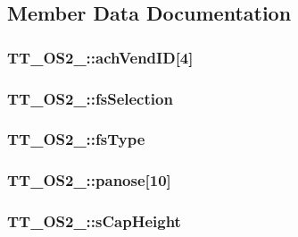 \subsection{Member Data Documentation}
\hypertarget{struct_t_t___o_s2___a01d027dea4daddaa278ba39c2c957d11}{
\subsubsection[{ach\-Vend\-I\-D}]{ T\-T\-\_\-\-O\-S2\-\_\-\-::ach\-Vend\-I\-D\mbox{[}4\mbox{]}}}\label{struct_t_t___o_s2___a01d027dea4daddaa278ba39c2c957d11}
\hypertarget{struct_t_t___o_s2___a12e9e1f0b21f424715c881d9f4e012ce}{
\subsubsection[{fs\-Selection}]{ T\-T\-\_\-\-O\-S2\-\_\-\-::fs\-Selection}}\label{struct_t_t___o_s2___a12e9e1f0b21f424715c881d9f4e012ce}
\hypertarget{struct_t_t___o_s2___a8c37e3fa40954af5e5f9206eb6631eb7}{
\subsubsection[{fs\-Type}]{ T\-T\-\_\-\-O\-S2\-\_\-\-::fs\-Type}}\label{struct_t_t___o_s2___a8c37e3fa40954af5e5f9206eb6631eb7}
\hypertarget{struct_t_t___o_s2___a3908fb0cb6db5287e559b8298884673a}{
\subsubsection[{panose}]{ T\-T\-\_\-\-O\-S2\-\_\-\-::panose\mbox{[}10\mbox{]}}}\label{struct_t_t___o_s2___a3908fb0cb6db5287e559b8298884673a}
\hypertarget{struct_t_t___o_s2___ac755913b648d535d1207927e4a6f1ec0}{
\subsubsection[{s\-Cap\-Height}]{ T\-T\-\_\-\-O\-S2\-\_\-\-::s\-Cap\-Height}}\label{struct_t_t___o_s2___ac755913b648d535d1207927e4a6f1ec0}
